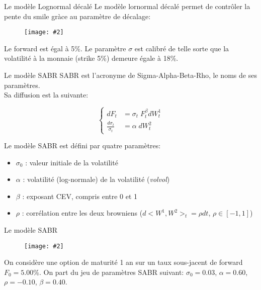 \documentclass{beamer}
\newcommand{\FIG}[2]{\texttt{[image: \#2]}}
\begin{document}
\begin{frame}{Le modèle Lognormal décalé}
Le modèle lornormal décalé permet de contrôler la pente du smile gràce au paramètre de décalage:\\
\begin{figure}[h]
\FIG{7cm}{figures/smile_shifted_log.jpg}
\end{figure}
Le forward est égal à 5\%. Le paramètre $\sigma$ est calibré de telle sorte que la volatilité à la monnaie (strike 5\%) demeure égale à 18\%. 
\end{frame}

\begin{frame}{Le modèle SABR}
SABR est l'acronyme de Sigma-Alpha-Beta-Rho, le noms de ses paramètres.\\
Sa diffusion est la suivante:

\[
\left\{
\begin{split}
dF_t &= \sigma_t \;F_t^\beta dW_t^1\\
\frac{d\sigma_t}{\sigma_t} &= \alpha \; dW_t^2
\end{split}
\right.
\]

Le modèle SABR est défini par quatre paramètres:

\begin{itemize}
\item $\sigma_0$ : valeur initiale de la volatilité

\item $\alpha$ : volatilité (log-normale) de la volatilité (\textit{volvol})

\item $\beta$ : exposant CEV, compris entre 0 et 1%

\item $\rho$ : corrélation entre les deux browniens ($d<W^1,W^2>_t = \rho dt$, $\rho\in[-1,1]$)

\end{itemize}
\end{frame}

\begin{frame}{Le modèle SABR}
\begin{figure}[h]
\FIG{7cm}{figures/sabr_impact_param.jpg}
\end{figure}
On considère une option de maturité 1 an sur un taux sous-jacent de forward $F_0=5.00\%$. On part du jeu de paramètres SABR suivant: $\sigma_0=0.03$, $\alpha=0.60$, $\rho=-0.10$, $\beta=0.40$.
\end{frame}
\end{document}
